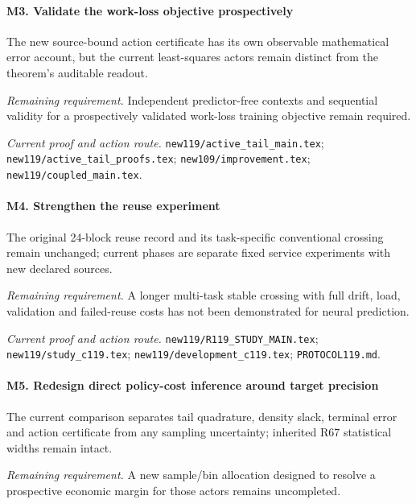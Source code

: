\paragraph{M3. Validate the work-loss objective prospectively}

The new source-bound action certificate has its own observable mathematical error account, but the current least-squares actors remain distinct from the theorem's auditable readout.

\par\emph{Remaining requirement.} Independent predictor-free contexts and sequential validity for a prospectively validated work-loss training objective remain required.

\par\emph{Current proof and action route.} \nolinkurl{new119/active_tail_main.tex}; \nolinkurl{new119/active_tail_proofs.tex}; \nolinkurl{new109/improvement.tex}; \nolinkurl{new119/coupled_main.tex}.

\paragraph{M4. Strengthen the reuse experiment}

The original 24-block reuse record and its task-specific conventional crossing remain unchanged; current phases are separate fixed service experiments with new declared sources.

\par\emph{Remaining requirement.} A longer multi-task stable crossing with full drift, load, validation and failed-reuse costs has not been demonstrated for neural prediction.

\par\emph{Current proof and action route.} \nolinkurl{new119/R119_STUDY_MAIN.tex}; \nolinkurl{new119/study_c119.tex}; \nolinkurl{new119/development_c119.tex}; \nolinkurl{PROTOCOL119.md}.

\paragraph{M5. Redesign direct policy-cost inference around target precision}

The current comparison separates tail quadrature, density slack, terminal error and action certificate from any sampling uncertainty; inherited R67 statistical widths remain intact.

\par\emph{Remaining requirement.} A new sample/\allowbreak{}bin allocation designed to resolve a prospective economic margin for those actors remains uncompleted.

